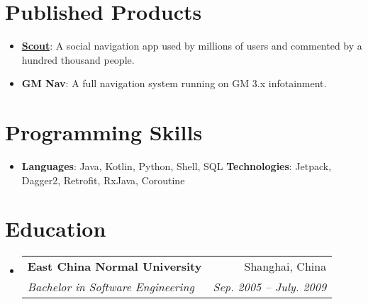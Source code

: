 \documentclass[letterpaper,11pt]{article}
\makeatletter
\newcommand{\resumeItem}[2]{
  \item\small{
    \textbf{#1}{: #2 \vspace{-2pt}}
  }
}
\newcommand{\resumeSubheading}[4]{
  \vspace{-1pt}\item
    \begin{tabular*}{0.97\textwidth}{l@{\extracolsep{\fill}}r}
      \textbf{#1} & #2 \\
      \textit{\small#3} & \textit{\small #4} \\
    \end{tabular*}\vspace{-5pt}
}
\newcommand{\resumeSubItem}[2]{\resumeItem{#1}{#2}\vspace{-4pt}}
\newcommand{\resumeSubHeadingListStart}{\begin{itemize}[leftmargin=*]}
\newcommand{\resumeSubHeadingListEnd}{\end{itemize}}
\makeatother
\begin{document}
\section{Published Products}
  \resumeSubHeadingListStart
    \resumeSubItem{\href{https://play.google.com/store/apps/details?id=com.telenav.app.android.scout_us}{Scout}}
      {A social navigation app used by millions of users and commented by a hundred thousand people.}
    \resumeSubItem{GM Nav}
      {A full navigation system running on GM 3.x infotainment.}
  \resumeSubHeadingListEnd

%
\section{Programming Skills}
 \resumeSubHeadingListStart
   \item{
     \textbf{Languages}{: Java, Kotlin, Python, Shell, SQL}
     \hfill
     \textbf{Technologies}{: Jetpack, Dagger2, Retrofit, RxJava, Coroutine}
   }
 \resumeSubHeadingListEnd


\section{Education}
  \resumeSubHeadingListStart
    \resumeSubheading
      {East China Normal University}{Shanghai, China}
      {Bachelor in Software Engineering}{Sep. 2005 -- July. 2009}
  \resumeSubHeadingListEnd
\end{document}
